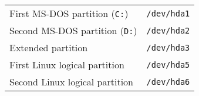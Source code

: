 {\newpage
\clearpage
\samepage \begin{tabular}{ll} 
First MS-DOS partition ({\tt C:})     & {\tt /dev/hda1} \\ 
Second MS-DOS partition ({\tt D:})    & {\tt /dev/hda2} \\ 
Extended partition                    & {\tt /dev/hda3} \\ 
First Linux logical partition         & {\tt /dev/hda5} \\ 
Second Linux logical partition        & {\tt /dev/hda6} 
\end{tabular}
}

{\newpage
\clearpage
\samepage {}
}

{\newpage
\clearpage
\samepage {}
}

{\newpage
\clearpage
\samepage {}
}

{\newpage
\clearpage
\samepage {}
}

{\newpage
\clearpage
\samepage {}
}

{\newpage
\clearpage
\samepage {}
}

{\newpage
\clearpage
\samepage {}
}

{\newpage
\clearpage
\samepage {}
}

{\newpage
\clearpage
\samepage {}
}

{\newpage
\clearpage
\samepage {}
}

{\newpage
\clearpage
\samepage {}
}

{\newpage
\clearpage
\samepage {}
}

{\newpage
\clearpage
\samepage {}
}

{\newpage
\clearpage
\samepage {}
}

{\newpage
\clearpage
\samepage {}
}

{\newpage
\clearpage
\samepage {}
}

